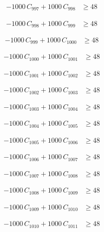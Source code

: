 \documentclass[a4paper,11pt]{article}
\begin{document}
\begin{align}
-1000\,C_{997} + 1000\,C_{998} &\geq 48 \nonumber
\end{align}

\begin{align}
-1000\,C_{998} + 1000\,C_{999} &\geq 48 \nonumber
\end{align}

\begin{align}
-1000\,C_{999} + 1000\,C_{1000} &\geq 48 \nonumber
\end{align}

\begin{align}
-1000\,C_{1000} + 1000\,C_{1001} &\geq 48 \nonumber
\end{align}

\begin{align}
-1000\,C_{1001} + 1000\,C_{1002} &\geq 48 \nonumber
\end{align}

\begin{align}
-1000\,C_{1002} + 1000\,C_{1003} &\geq 48 \nonumber
\end{align}

\begin{align}
-1000\,C_{1003} + 1000\,C_{1004} &\geq 48 \nonumber
\end{align}

\begin{align}
-1000\,C_{1004} + 1000\,C_{1005} &\geq 48 \nonumber
\end{align}

\begin{align}
-1000\,C_{1005} + 1000\,C_{1006} &\geq 48 \nonumber
\end{align}

\begin{align}
-1000\,C_{1006} + 1000\,C_{1007} &\geq 48 \nonumber
\end{align}

\begin{align}
-1000\,C_{1007} + 1000\,C_{1008} &\geq 48 \nonumber
\end{align}

\begin{align}
-1000\,C_{1008} + 1000\,C_{1009} &\geq 48 \nonumber
\end{align}

\begin{align}
-1000\,C_{1009} + 1000\,C_{1010} &\geq 48 \nonumber
\end{align}

\begin{align}
-1000\,C_{1010} + 1000\,C_{1011} &\geq 48 \nonumber
\end{align}
\end{document}
